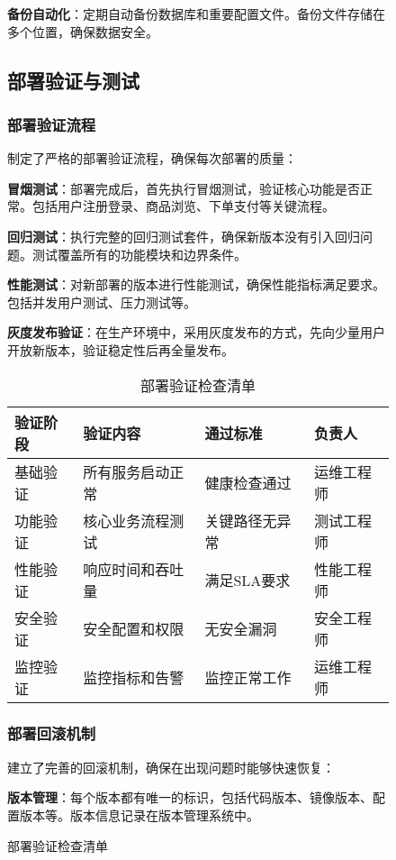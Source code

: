 \documentclass[a4paper,12pt]{article}
\begin{document}
\begin{figure}[H]
\textbf{备份自动化}：定期自动备份数据库和重要配置文件。备份文件存储在多个位置，确保数据安全。

\subsection{部署验证与测试}

\subsubsection{部署验证流程}

制定了严格的部署验证流程，确保每次部署的质量：

\textbf{冒烟测试}：部署完成后，首先执行冒烟测试，验证核心功能是否正常。包括用户注册登录、商品浏览、下单支付等关键流程。

\textbf{回归测试}：执行完整的回归测试套件，确保新版本没有引入回归问题。测试覆盖所有的功能模块和边界条件。

\textbf{性能测试}：对新部署的版本进行性能测试，确保性能指标满足要求。包括并发用户测试、压力测试等。

\textbf{灰度发布验证}：在生产环境中，采用灰度发布的方式，先向少量用户开放新版本，验证稳定性后再全量发布。

\begin{table}[H]
\centering
\caption{部署验证检查清单}
\begin{tabular}{|p{3cm}|p{4cm}|p{2.5cm}|p{3cm}|}
\hline
\textbf{验证阶段} & \textbf{验证内容} & \textbf{通过标准} & \textbf{负责人} \\
\hline
基础验证 & 所有服务启动正常 & 健康检查通过 & 运维工程师 \\
\hline
功能验证 & 核心业务流程测试 & 关键路径无异常 & 测试工程师 \\
\hline
性能验证 & 响应时间和吞吐量 & 满足SLA要求 & 性能工程师 \\
\hline
安全验证 & 安全配置和权限 & 无安全漏洞 & 安全工程师 \\
\hline
监控验证 & 监控指标和告警 & 监控正常工作 & 运维工程师 \\
\hline
\end{tabular}
\end{table}

\subsubsection{部署回滚机制}

建立了完善的回滚机制，确保在出现问题时能够快速恢复：

\textbf{版本管理}：每个版本都有唯一的标识，包括代码版本、镜像版本、配置版本等。版本信息记录在版本管理系统中。


\end{figure}
\end{document}
